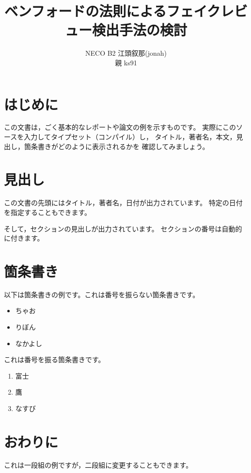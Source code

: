 \documentclass[a4paper, twocolumn]{jsarticle}
\begin{document}
\title{ベンフォードの法則によるフェイクレビュー検出手法の検討}
\author{
  NECO B2 江頭叙那(jonah)
  \\ 親 ks91 
}
\maketitle

\section{はじめに}

この文書は，ごく基本的なレポートや論文の例を示すものです。
実際にこのソースを入力してタイプセット（コンパイル）し，
タイトル，著者名，本文，見出し，箇条書きがどのように表示されるかを
確認してみましょう。

\section{見出し}

この文書の先頭にはタイトル，著者名，日付が出力されています。
特定の日付を指定することもできます。

そして，セクションの見出しが出力されています。
セクションの番号は自動的に付きます。

\section{箇条書き}

以下は箇条書きの例です。これは番号を振らない箇条書きです。

\begin{itemize}
  \item ちゃお
  \item りぼん
  \item なかよし
\end{itemize}

これは番号を振る箇条書きです。

\begin{enumerate}
  \item 富士
  \item 鷹
  \item なすび
\end{enumerate}

\section{おわりに}

これは一段組の例ですが，二段組に変更することもできます。
\end{document}
